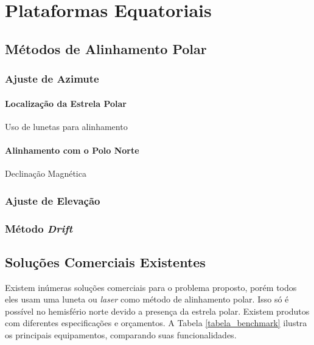 \section{Plataformas Equatoriais}

\subsection{Métodos de Alinhamento Polar}

\subsubsection{Ajuste de Azimute}

\paragraph{Localização da Estrela Polar}
Uso de lunetas para alinhamento

\paragraph{Alinhamento com o Polo Norte}
Declinação Magnética

\subsubsection{Ajuste de Elevação}

\subsubsection{Método \textit{Drift}}

\subsection{Soluções Comerciais Existentes}

Existem inúmeras soluções comerciais para o problema proposto, porém todos eles usam uma luneta ou \textit{laser} como método de alinhamento polar. Isso só é possível no hemisfério norte devido a presença da estrela polar. Existem produtos com diferentes especificações e orçamentos. A Tabela \ref{tabela_benchmark} ilustra os principais equipamentos, comparando suas funcionalidades. 


